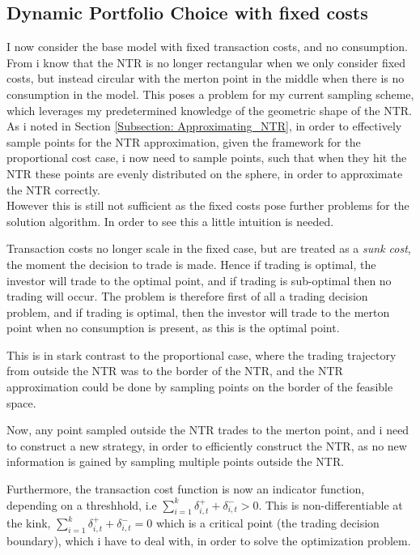 \documentclass[11pt]{article}
\begin{document}
\subsection{Dynamic Portfolio Choice with fixed costs} \label{Subsection: Results_FixedCosts_No_Correlation}
I now consider the base model with fixed transaction costs, and no consumption.
From \autocite{Dybvig2020} i know that the \ac{NTR} is no longer rectangular when we only consider fixed costs, but instead circular with the merton point in the middle when there is no consumption in the model.
This poses a problem for my current sampling scheme, which leverages my predetermined knowledge of the geometric shape of the \ac{NTR}.
As i noted in Section \ref{Subsection: Approximating_NTR}, in order to effectively sample points for the \ac{NTR} approximation, given the framework for the proportional cost case,
 i now need to sample points, such that when they hit the \ac{NTR} these points are evenly distributed on the sphere, in order to approximate the \ac{NTR} correctly.\\
However this is still not sufficient as the fixed costs pose further problems for the solution algorithm. In order to see this a little intuition is needed.

Transaction costs no longer scale in the fixed case, but are treated as a \textit{sunk cost}, the moment the decision to trade is made. Hence if trading is optimal, the investor will trade to the optimal point,
and if trading is sub-optimal then no trading will occur. The problem is therefore first of all a trading decision problem, and if trading is optimal, then the investor will trade to the merton point when no consumption is present, as this is the optimal point.

This is in stark contrast to the proportional case, where the trading trajectory from outside the \ac{NTR} was to the border of the \ac{NTR}, and the \ac{NTR} approximation could be done by sampling points on the border of the feasible space.

Now, any point sampled outside the \ac{NTR} trades to the merton point, and i need to construct a new strategy, 
in order to efficiently construct the \ac{NTR}, as no new information is
gained by sampling multiple points outside the \ac{NTR}.

Furthermore, the transaction cost function is now an indicator function, depending on a threshhold, i.e $\sum^{k}_{i=1} \delta^{+}_{i,t} + \delta^{-}_{i,t}  > 0$.
This is non-differentiable at the kink, $\sum^{k}_{i=1} \delta^{+}_{i,t} + \delta^{-}_{i,t} =0$ 
which is a critical point (the trading decision boundary), which i have to deal with, in order to solve the optimization problem.
\end{document}

